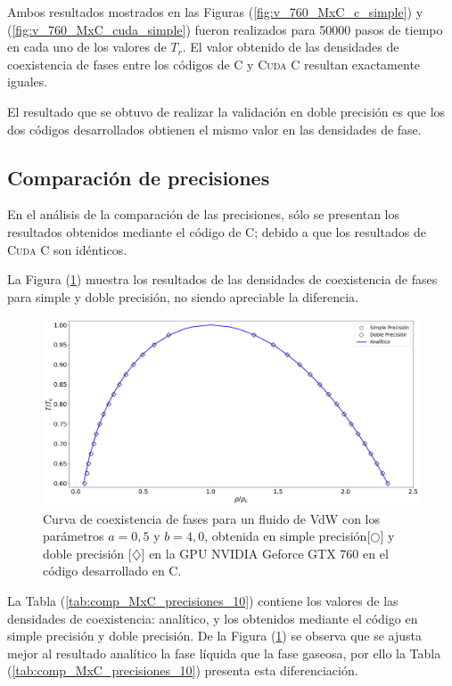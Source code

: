 Ambos resultados mostrados en las Figuras (\ref{fig:v_760_MxC_c_simple}) y (\ref{fig:v_760_MxC_cuda_simple}) fueron realizados para 50000 pasos de tiempo en cada uno de los valores de $T_r$. El valor obtenido de las densidades de coexistencia de fases entre los códigos de \textsc{C} y \textsc{Cuda C} resultan exactamente iguales. 

El resultado que se obtuvo de realizar la validación en doble precisión es que los dos códigos desarrollados obtienen el mismo valor en las densidades de fase.

\newpage
\subsection{Comparación de precisiones}

En el análisis de la comparación de las precisiones, sólo se presentan los resultados obtenidos mediante el código de \textsc{C}; debido a que los resultados de \textsc{Cuda C} son idénticos.

La Figura (\ref{fig:v_760_MxC_c_comparacion}) muestra los resultados de las densidades de coexistencia de fases para simple y doble precisión, no siendo apreciable la diferencia.

\begin{figure}[htbp]
	\centering
	\includegraphics[width=\textwidth]{figs/cap4/v_760_MxC_c_comparacion}
	\caption{Curva de coexistencia de fases para un fluido de VdW con los parámetros $a = 0,5 $ y $b = 4,0 $, obtenida en simple precisión[$\bigcirc$] y doble precisión [$\diamondsuit$] en la GPU NVIDIA Geforce GTX 760 en el código desarrollado en \textsc{C}.} 
	\label{fig:v_760_MxC_c_comparacion}	
\end{figure}


La Tabla (\ref{tab:comp_MxC_precisiones_10}) contiene los valores de las densidades de coexistencia: analítico, y los obtenidos mediante el código en simple precisión y doble precisión. De la Figura (\ref{fig:v_760_MxC_c_comparacion}) se observa que se ajusta mejor al resultado analítico la fase líquida que la fase gaseosa, por ello la Tabla (\ref{tab:comp_MxC_precisiones_10}) presenta esta diferenciación.

